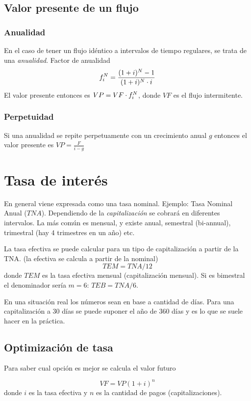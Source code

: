 \documentclass[twocolumn,10pt]{article}
\begin{document}
\subsection{Valor presente de un flujo}



\subsubsection{Anualidad}

En el caso de tener un flujo idéntico a intervalos de tiempo regulares, se trata de una \textit{anualidad}. Factor de anualidad
\[
f_i^N = \frac{(1+i)^N-1}{(1+i)^N\cdot i}
\]
El valor presente entonces es \( VP = VF \cdot f_i^N\), donde $VF$ es el flujo intermitente.

\subsubsection{Perpetuidad}
Si una anualidad se repite perpetuamente con un crecimiento anual $g$ entonces el valor presente es $VP = \frac{F}{i-g}$



\section{Tasa de interés}
En general viene expresada como una tasa nominal. Ejemplo: Tasa Nominal Anual ($TNA$). Dependiendo de la \textit{capitalización} se cobrará en diferentes intervalos. La más común es mensual, y existe anual, semestral (bi-annual), trimestral (hay 4 trimestres en un año) etc.

La tasa efectiva se puede calcular para un tipo de capitalización a partir de la TNA. (la efectiva se calcula a partir de la nominal)
\[
   TEM = TNA / 12	
\]
donde $TEM$ es la tasa efectiva mensual (capitalización mensual). Si es bimestral el denominador sería $m=6$: $TEB = TNA/6$.

En una situación real los números sean en base a cantidad de días. Para una capitalización a 30 días se puede suponer el año de 360 días y es lo que se suele hacer en la práctica. 

\subsection{Optimización de tasa}

Para saber cual opción es mejor se calcula el valor futuro 

\[
	VF = VP (1+i)^{n}
\]
donde $i$ es la tasa efectiva y $n$ es la cantidad de pagos (capitalizaciones).
\end{document}
